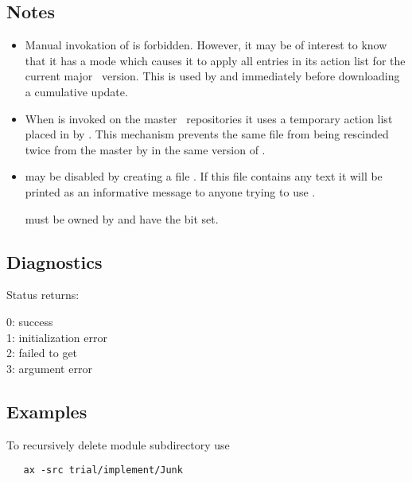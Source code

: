 \subsection*{Notes}

\begin{itemize}
\item
   Manual invokation of  is forbidden.  However, it may be of
   interest to know that it has a mode which causes it to apply all entries in
   its action list for the current major \aipspp\ version.  This is used by
    and  immediately before downloading a
   cumulative update.

\item
   When  is invoked on the master \rcs\ repositories it uses a
   temporary action list placed in  by .
   This mechanism prevents the same file from being rescinded twice from the
   master by  in the same version of \aipspp.

\item
    may be disabled by creating a file .
   If this file contains any text it will be printed as an informative message
   to anyone trying to use .

    must be owned by  and have the  bit
   set.
\end{itemize}

\subsection*{Diagnostics}

Status returns:
\begin{status}
   0: success\\
   1: initialization error\\
   2: failed to get \\
   3: argument error
\end{status}

\subsection*{Examples}

To recursively delete module subdirectory  use
 
\begin{verbatim}
   ax -src trial/implement/Junk
\end{verbatim}
 
